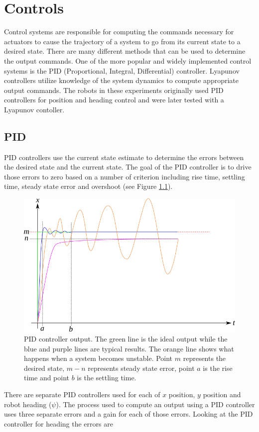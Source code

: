\chapter{Controls}
\label{ch:controls}
Control systems are responsible for computing the commands necessary for actuators to cause the trajectory of a system to go from its current state to a desired state. There are many different methods that can be used to determine the output commands. One of the more popular and widely implemented control systems is the PID (Proportional, Integral, Differential) controller. Lyapunov controllers utilize knowledge of the system dynamics to compute appropriate output commands. The robots in these experiments originally used PID controllers for position and heading control and were later tested with a Lyapunov contoller.

\section{PID}
\label{sec:pid}
PID controllers use the current state estimate to determine the errors between the desired state and the current state. The goal of the PID controller is to drive those errors to zero based on a number of criterion including rise time, settling time, steady state error and overshoot (see Figure \ref{fig:pid}).

\begin{figure}[ht!]
	\centering
	\includegraphics[width=.75\textwidth]{images/pid}
	\caption{PID controller output. The green line is the ideal output while the blue and purple lines are typical results. The orange line shows what happens when a system becomes unstable. Point $m$ represents the desired state, $m-n$ represents steady state error, point $a$ is the rise time and point $b$ is the settling time.}
	\label{fig:pid}
\end{figure}

There are separate PID controllers used for each of $x$ position, $y$ position and robot heading ($\psi$). The process used to compute an output using a PID controller uses three separate errors and a gain for each of those errors. Looking at the PID controller for heading the errors are

